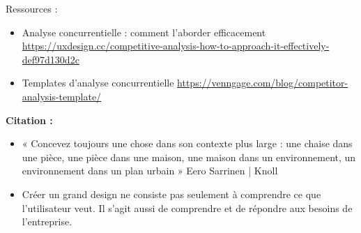 Ressources :

\begin{itemize}
\item Analyse concurrentielle : comment l'aborder efficacement \url{https://uxdesign.cc/competitive-analysis-how-to-approach-it-effectively-def97d130d2c}
\item Templates d'analyse concurrentielle \url{https://venngage.com/blog/competitor-analysis-template/}
\end{itemize}

\textbf{Citation :}

\begin{itemize}
\item « Concevez toujours une chose dans son contexte plus large : une chaise dans une pièce, une pièce dans une maison, une maison dans un environnement, un environnement dans un plan urbain » Eero Sarrinen | Knoll
\item Créer un grand design ne consiste pas seulement à comprendre ce que l'utilisateur veut. Il s'agit aussi de comprendre et de répondre aux besoins de l'entreprise.
\end{itemize}

